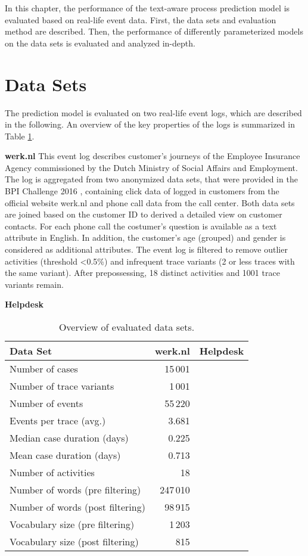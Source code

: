 In this chapter, the performance of the text-aware process prediction model is evaluated based on real-life event data.
First, the data sets and evaluation method are described. Then, the performance of differently parameterized models on the data sets is evaluated and analyzed in-depth.


\section{Data Sets}

The prediction model is evaluated on two real-life event logs, which are described in the following. An overview of the key properties of the logs is summarized in Table \ref{tab:logs}.

\textbf{werk.nl} This event log describes customer's journeys of the Employee Insurance Agency commissioned by the Dutch Ministry of Social Affairs and Employment. The log is aggregated from two anonymized data sets, that were provided in the BPI Challenge 2016 \cite{bpichallenge2016}, containing click data of logged in customers from the official website werk.nl and phone call data from the call center.
Both data sets are joined based on the customer ID to derived a detailed view on customer contacts.
For each phone call the costumer's question is available as a text attribute in English. In addition, the customer's age (grouped) and gender is considered as additional attributes.
The event log is filtered to remove outlier activities (threshold <0.5\%) and infrequent trace variants (2 or less traces with the same variant). After prepossessing, 18 distinct activities and 1001 trace variants remain.

\textbf{Helpdesk}

\begin{table}[!htbp]
	\begin{tabularx}{\textwidth}{l r l }
		\toprule
		\textbf{Data Set} & \textbf{werk.nl} & \textbf{Helpdesk}  \\
		\midrule
		Number of cases & 15\,001& \\
		Number of trace variants & 1\,001 & \\
		Number of events & 55\,220 & \\
		Events per trace (avg.) & 3.681& \\
		Median case duration (days) & 0.225& \\
		Mean case duration (days)& 0.713 & \\
		Number of activities & 18 & \\
		Number of words (pre filtering) &247\,010 & \\
		Number of words (post filtering) &98\,915 & \\
		Vocabulary size (pre filtering) & 1\,203 & \\
		Vocabulary size (post filtering) & 815 & \\
		\bottomrule
	\end{tabularx}
	\caption[Overview of evaluated data sets]{Overview of evaluated data sets.}
	\label{tab:logs}
\end{table}


